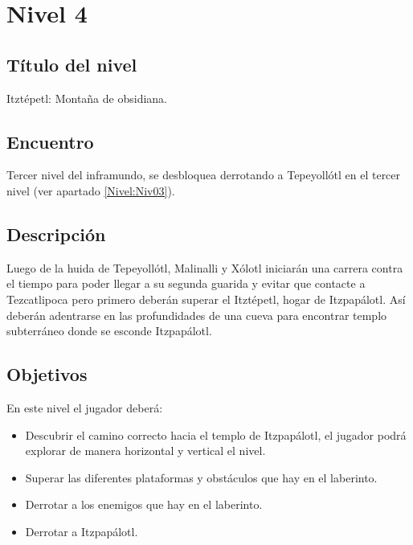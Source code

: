 \section{Nivel 4} \label{Nivel:Niv04}
        \subsection{Título del nivel}
        Itztépetl: Montaña de obsidiana.
        \subsection{Encuentro}
Tercer nivel del inframundo, se desbloquea derrotando a Tepeyollótl en el tercer nivel (ver apartado \ref{Nivel:Niv03}).
        \subsection{Descripción}
        Luego de la huida de Tepeyollótl, Malinalli y Xólotl iniciarán una carrera contra el tiempo para poder llegar a su segunda guarida y evitar que contacte a Tezcatlipoca pero primero deberán superar el Itztépetl, hogar de Itzpapálotl. Así deberán adentrarse en las profundidades de una cueva para encontrar templo subterráneo donde se esconde Itzpapálotl. 
        \subsection{Objetivos}
En este nivel el jugador deberá:        
\begin{itemize}
        \item Descubrir el camino correcto hacia el templo de Itzpapálotl, el jugador podrá explorar de manera horizontal y vertical el nivel.
        \item Superar las diferentes plataformas y obstáculos que hay en el laberinto. 
        \item Derrotar a los enemigos que hay en el laberinto.
        \item Derrotar a Itzpapálotl.
\end{itemize}
